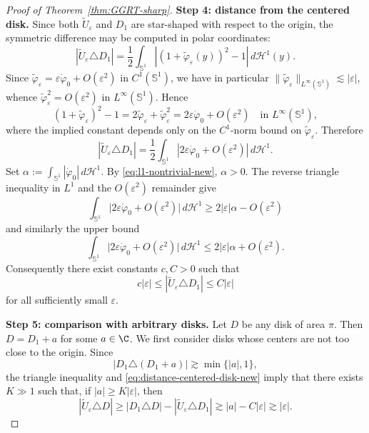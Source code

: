 \begin{proof}[Proof of Theorem~\ref{thm:GGRT-sharp}]
\medskip
\noindent
{\bf Step 4: distance from the centered disk.} Since both $\widetilde U_\varepsilon$ and $D_1$ are star-shaped with respect to
the origin, the symmetric difference may be computed in polar coordinates:
\[
|\widetilde U_\varepsilon \triangle D_1|
=
\frac12\int_{\mathbb S^1}
\left|(1+\widetilde\varphi_\varepsilon(y))^2-1\right|
\,d\mathcal H^1(y).
\]
Since \(\widetilde\varphi_\varepsilon=\varepsilon\dot\varphi_0+O(\varepsilon^2)\)
in \(C^1(\mathbb S^1)\), we have in particular
\(\|\widetilde\varphi_\varepsilon\|_{L^\infty(\mathbb S^1)}\lesssim |\varepsilon|\),
whence \(\widetilde\varphi_\varepsilon^2=O(\varepsilon^2)\) in
\(L^\infty(\mathbb S^1)\). Hence
\[
(1+\widetilde\varphi_\varepsilon)^2-1
=
2\widetilde\varphi_\varepsilon+\widetilde\varphi_\varepsilon^2
=
2\varepsilon \dot\varphi_0 + O(\varepsilon^2)
\quad \text{in } L^\infty(\mathbb S^1),
\]
where the implied constant depends only on the \(C^1\)-norm bound on
\(\widetilde\varphi_\varepsilon\). Therefore
\[
|\widetilde U_\varepsilon \triangle D_1|
=
\frac12\int_{\mathbb S^1}
\left|2\varepsilon \dot\varphi_0 + O(\varepsilon^2)\right|
\,d\mathcal H^1.
\]
Set \(\alpha:=\int_{\mathbb S^1}|\dot\varphi_0|\,d\mathcal H^1\). By
\eqref{eq:l1-nontrivial-new}, \(\alpha>0\). The reverse triangle inequality in
\(L^1\) and the \(O(\varepsilon^2)\) remainder give
\[
\int_{\mathbb S^1}\bigl|2\varepsilon\dot\varphi_0+O(\varepsilon^2)\bigr|\,d\mathcal H^1
\geq
2|\varepsilon|\alpha-O(\varepsilon^2)
\]
and similarly the upper bound
\[
\int_{\mathbb S^1}\bigl|2\varepsilon\dot\varphi_0+O(\varepsilon^2)\bigr|\,d\mathcal H^1
\leq
2|\varepsilon|\alpha+O(\varepsilon^2).
\]
Consequently there exist constants $c,C>0$ such that
\begin{equation}\label{eq:distance-centered-disk-new}
c|\varepsilon|
\leq
|\widetilde U_\varepsilon \triangle D_1|
\leq
C|\varepsilon|
\end{equation}
for all sufficiently small $\varepsilon$.

\medskip
\noindent
{\bf Step 5: comparison with arbitrary disks.} Let $D$ be any disk of area $\pi$. Then $D=D_1+a$ for some $a\in \C$. We first consider disks whose centers are not too close to the origin.
Since
\[
|D_1\triangle (D_1+a)|
\gtrsim \min\{|a|,1\},
\]
the triangle inequality and \eqref{eq:distance-centered-disk-new} imply that
there exists $K\gg 1$ such that, if $|a|\geq K|\varepsilon|$, then
\begin{equation}\label{eq:far-disks-new}
|\widetilde U_\varepsilon \triangle D|
\geq
|D_1\triangle D|-|\widetilde U_\varepsilon\triangle D_1|
\gtrsim
|a|-C|\varepsilon|
\gtrsim
|\varepsilon|.
\end{equation}


\end{proof}
